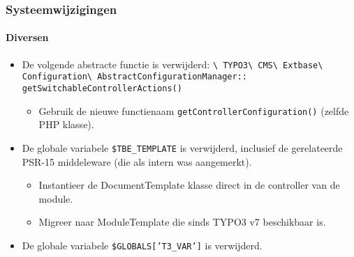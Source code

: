 \begin{frame}[fragile]
	\frametitle{Systeemwijzigingen}
	\framesubtitle{Diversen}

	\begin{itemize}

		\item De volgende abstracte functie is verwijderd:\newline
			\smaller
				\texttt{\textbackslash
					TYPO3\textbackslash
					CMS\textbackslash
					Extbase\textbackslash
					Configuration\textbackslash
					AbstractConfigurationManager::}\newline
					\texttt{getSwitchableControllerActions()}
			\normalsize

			\begin{itemize}\smaller
				\item[\ding{228}] Gebruik de nieuwe functienaam \texttt{getControllerConfiguration()} (zelfde PHP klasse).
			\end{itemize}\normalsize

		\item De globale variabele \texttt{\$TBE\_TEMPLATE} is verwijderd, inclusief
			de gerelateerde PSR-15 middeleware (die als intern was aangemerkt).

			\begin{itemize}\smaller
				\item[\ding{228}] Instantieer de DocumentTemplate klasse direct in de controller van de module.
				\item[\ding{228}] Migreer naar ModuleTemplate die sinds TYPO3 v7 beschikbaar is.
			\end{itemize}\normalsize

		\item De globale variabele \texttt{\$GLOBALS['T3\_VAR']} is verwijderd.\newline

	\end{itemize}

\end{frame}


